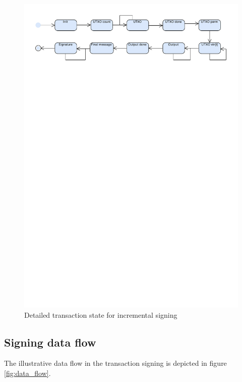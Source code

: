 \documentclass[]{article}
\begin{document}
\begin{figure}[H]
	\centering
	\includegraphics[width=1.\textwidth,trim={0 24cm 0 1cm},clip, angle=0]{img/tsx_state_detail.pdf}
	\caption{Detailed transaction state for incremental signing} \label{fig:detailed_state}
\end{figure}

\subsection{Signing data flow}
The illustrative data flow in the transaction signing is depicted in figure \ref{fig:data_flow}.
\end{document}
